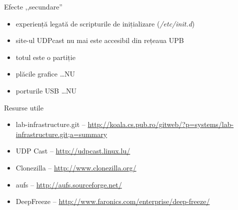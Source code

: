 \documentclass{simple}
\begin{document}
\begin{frame}{Efecte ,,secundare''}
  \begin{itemize}
    \item experiență legată de scripturile de inițializare
      (\textit{/etc/init.d})
    \item site-ul UDPcast nu mai este accesibil din rețeaua UPB
    \item totul este o partiție
    \item plăcile grafice \ldots NU
    \item porturile USB \ldots NU
  \end{itemize}
\end{frame}

\begin{frame}{Resurse utile}
  \begin{itemize}
    \item lab-infrastructure.git --
      \url{http://koala.cs.pub.ro/gitweb/?p=systems/lab-infrastructure.git;a=summary}
    \item UDP Cast -- \url{http://udpcast.linux.lu/}
    \item Clonezilla -- \url{http://www.clonezilla.org/}
    \item aufs -- \url{http://aufs.sourceforge.net/}
    \item DeepFreeze -- \url{http://www.faronics.com/enterprise/deep-freeze/}
  \end{itemize}
\end{frame}
\end{document}
